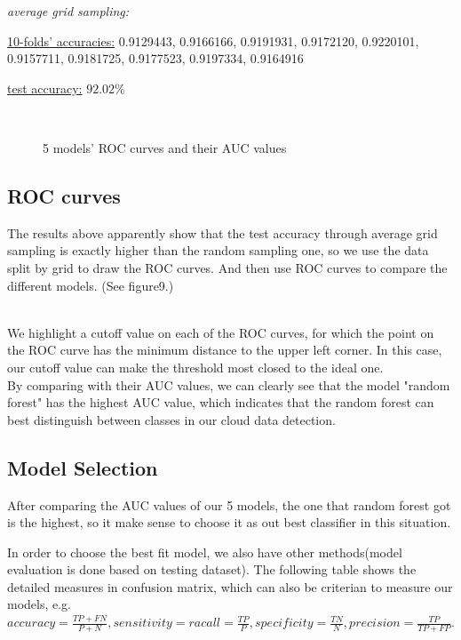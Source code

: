 \documentclass[12pt]{extarticle}
\begin{document}
\cdot \emph{average grid sampling:}

\underline{10-folds’ accuracies:}
0.9129443, 0.9166166, 0.9191931, 0.9172120, 0.9220101, 0.9157711, 0.9181725, 0.9177523, 0.9197334,
0.9164916


\underline{test accuracy:}  $92.02\%$\\


\begin{figure}
\centering
{}
\quad
{}
\quad
{}
\\
\quad
{}
\quad
{}
\caption{5 models' ROC curves and their AUC values}\label{fig 1}
\end{figure}


\subsection{ROC curves}
The results above apparently show that the test accuracy through average grid sampling is exactly higher than the random sampling one, so we use the data split by grid to draw the ROC curves. And then use ROC curves to compare the different models. (See figure9.)

\\We highlight a cutoff value on each of the ROC curves, for which the point on the ROC curve has the minimum distance to the upper left corner. In this case, our cutoff value can make the threshold most closed to the ideal one.
\\By comparing with their AUC values, we can clearly see that the model "random forest" has the highest AUC value, which indicates that the random forest can best distinguish between classes in our cloud data detection.

\subsection{Model Selection}
After comparing the AUC values of our 5 models, the one that random forest got is the highest, so it make sense to choose it as out best classifier in this situation.

In order to choose the best fit model, we also have other methods(model evaluation is done based on testing dataset). The following table shows the detailed measures in confusion matrix, which can also be criterian to measure our models, e.g. $accuracy = \frac{TP+FN}{P+N}, sensitivity = racall = \frac{TP}{P}, specif icity =\frac{TN}{N},precision = \frac{TP}{TP+FP}$. 
\end{document}
